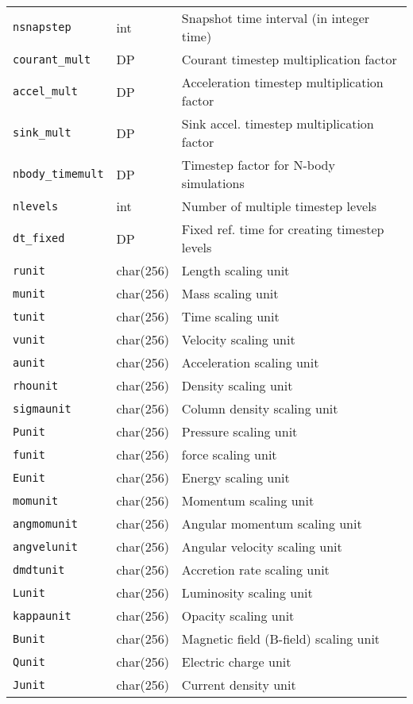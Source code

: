 \documentclass[a4paper]{article}
\newcommand{\var}[1]{\texttt{#1}}
\begin{document}
\begin{center}
\begin{supertabular}{|p{3cm}|p{2cm}|p{8cm}|}
\var{nsnapstep}  & int       & Snapshot time interval (in integer time) \\
\var{courant\_mult} & DP     & Courant timestep multiplication factor \\
\var{accel\_mult} & DP       & Acceleration timestep multiplication factor \\
\var{sink\_mult} & DP        & Sink accel. timestep multiplication factor \\
\var{nbody\_timemult} & DP   & Timestep factor for N-body simulations \\
\var{nlevels}    & int       & Number of multiple timestep levels \\
\var{dt\_fixed}  & DP        & Fixed ref. time for creating timestep levels \\ \hline
\var{runit}      & char(256) & Length scaling unit \\
\var{munit}      & char(256) & Mass scaling unit \\
\var{tunit}      & char(256) & Time scaling unit \\
\var{vunit}      & char(256) & Velocity scaling unit \\
\var{aunit}      & char(256) & Acceleration scaling unit \\
\var{rhounit}    & char(256) & Density scaling unit \\
\var{sigmaunit}  & char(256) & Column density scaling unit \\
\var{Punit}      & char(256) & Pressure scaling unit \\
\var{funit}      & char(256) & force scaling unit \\
\var{Eunit}      & char(256) & Energy scaling unit \\
\var{momunit}    & char(256) & Momentum scaling unit \\
\var{angmomunit} & char(256) & Angular momentum scaling unit \\
\var{angvelunit} & char(256) & Angular velocity scaling unit \\
\var{dmdtunit}   & char(256) & Accretion rate scaling unit \\
\var{Lunit}      & char(256) & Luminosity scaling unit \\
\var{kappaunit}  & char(256) & Opacity scaling unit \\
\var{Bunit}      & char(256) & Magnetic field (B-field) scaling unit \\
\var{Qunit}      & char(256) & Electric charge unit \\
\var{Junit}      & char(256) & Current density unit \\

\end{supertabular}
\end{center}
\end{document}
